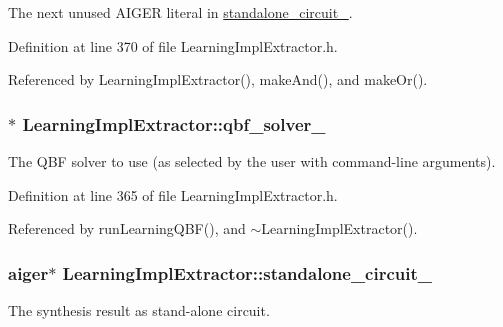 The next unused A\-I\-G\-E\-R literal in \hyperlink{classLearningImplExtractor_a17f7c47bf3e84fa5a70930e01a18deb2}{standalone\-\_\-circuit\-\_\-}. 



Definition at line 370 of file Learning\-Impl\-Extractor.\-h.



Referenced by Learning\-Impl\-Extractor(), make\-And(), and make\-Or().

\hypertarget{classLearningImplExtractor_a4147358129fcfb9e72a0ee27d7c16f51}{
\subsubsection[{qbf\-\_\-solver\-\_\-}]{$\ast$ Learning\-Impl\-Extractor\-::qbf\-\_\-solver\-\_\-\hspace{0.3cm}{\ttfamily [protected]}}}\label{classLearningImplExtractor_a4147358129fcfb9e72a0ee27d7c16f51}


The Q\-B\-F solver to use (as selected by the user with command-\/line arguments). 



Definition at line 365 of file Learning\-Impl\-Extractor.\-h.



Referenced by run\-Learning\-Q\-B\-F(), and $\sim$\-Learning\-Impl\-Extractor().

\hypertarget{classLearningImplExtractor_a17f7c47bf3e84fa5a70930e01a18deb2}{
\subsubsection[{standalone\-\_\-circuit\-\_\-}]{\setlength{\rightskip}{0pt plus 5cm}aiger$\ast$ Learning\-Impl\-Extractor\-::standalone\-\_\-circuit\-\_\-\hspace{0.3cm}{\ttfamily [protected]}}}\label{classLearningImplExtractor_a17f7c47bf3e84fa5a70930e01a18deb2}


The synthesis result as stand-\/alone circuit. 

